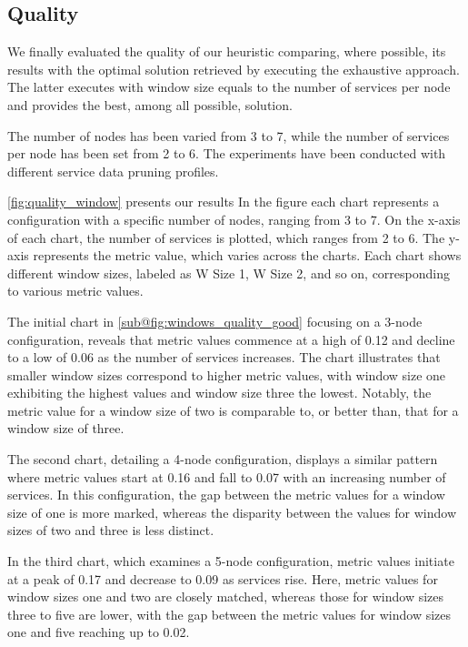\subsection{Quality}\label{subsec:experiments_quality}
We finally evaluated the quality of our heuristic comparing, where possible,
its results with the optimal solution retrieved by executing the exhaustive approach.
The latter executes with window size equals to the number of services per node and provides the best,
among all possible, solution.

The number of nodes has been varied from 3 to 7, while the number of services per node has been set from 2 to 6.
The experiments have been conducted with different service data pruning profiles.



\cref{fig:quality_window} presents our results
In the figure each chart represents a configuration with a specific number of nodes, ranging from 3 to 7.
On the x-axis of each chart, the number of services is plotted, which ranges from 2 to 6.
The y-axis represents the metric value, which varies across the charts.
Each chart shows different window sizes, labeled as W Size 1, W Size 2, and so on, corresponding to various metric values.

The initial chart in \cref{sub@fig:windows_quality_good} focusing on a 3-node configuration, reveals that metric values commence at a high of 0.12 and decline to a low of 0.06 as the number of services increases. The chart illustrates that smaller window sizes correspond to higher metric values, with window size one exhibiting the highest values and window size three the lowest. Notably, the metric value for a window size of two is comparable to, or better than, that for a window size of three.

The second chart, detailing a 4-node configuration, displays a similar pattern where metric values start at 0.16 and fall to 0.07 with an increasing number of services. In this configuration, the gap between the metric values for a window size of one is more marked, whereas the disparity between the values for window sizes of two and three is less distinct.

In the third chart, which examines a 5-node configuration, metric values initiate at a peak of 0.17 and decrease to 0.09 as services rise. Here, metric values for window sizes one and two are closely matched, whereas those for window sizes three to five are lower, with the gap between the metric values for window sizes one and five reaching up to 0.02.

